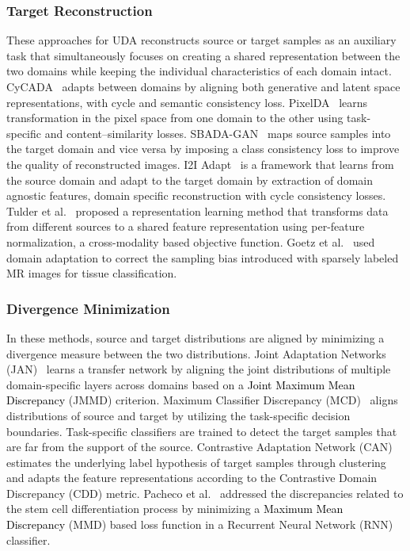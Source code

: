 \documentclass[journal,twoside,web]{IEEEtran}
\newcommand{\cc}{\textcolor{black}}
\begin{document}
\subsubsection{Target Reconstruction}These approaches for UDA reconstructs source or target samples as an auxiliary task that simultaneously focuses on creating a shared representation between the two domains while keeping the individual characteristics of each domain intact.
CyCADA~\cite{hoffman2017cycada} adapts between domains by aligning 
both generative and latent space
representations, with cycle and semantic consistency loss. PixelDA~\cite{bousmalis2017unsupervised} learns transformation in the pixel space from one domain to the other using task-specific and content–similarity losses. SBADA-GAN~\cite{russo2018source} maps source samples into the target domain and vice versa by imposing a class consistency loss to improve the quality of reconstructed images. I2I Adapt~\cite{murez2018image} is a framework that learns from the source domain and adapt to the target domain by extraction of domain agnostic features, domain specific reconstruction with cycle consistency losses. Tulder et al.~\cite{van2018learning} proposed a representation learning method that transforms data from different sources to a shared feature representation using per-feature normalization, a cross-modality based objective function. Goetz et al.~\cite{goetz2015dalsa} used domain adaptation to correct the sampling bias introduced with sparsely labeled MR images for tissue classification.
\subsubsection{Divergence Minimization} In these methods, source and target distributions are aligned by minimizing a divergence measure between the two distributions. Joint Adaptation Networks (JAN)~\cite{long2017deep} learns a transfer network by aligning the joint distributions of multiple domain-specific layers across domains based on a \cc{Joint Maximum Mean Discrepancy} (JMMD) criterion. Maximum Classifier Discrepancy (MCD)~\cite{saito2018maximum} aligns distributions of source and target by utilizing the task-specific decision boundaries. Task-specific classifiers are trained to detect the target samples that are far from the support of the source.
Contrastive Adaptation Network (CAN)~\cite{kang2019contrastive} estimates
the underlying label hypothesis of target samples through clustering and adapts the feature representations according to the  Contrastive Domain Discrepancy (CDD) metric. Pacheco et al.~\cite{pacheco2019unsupervised} addressed the discrepancies related to the stem cell differentiation process by minimizing a \cc{Maximum Mean Discrepancy} (MMD) based loss function in a Recurrent Neural Network (RNN) classifier.
\end{document}
